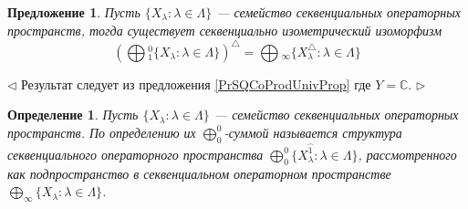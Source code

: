 \documentclass[12pt]{article}
\newtheorem{proposition}[theorem]{Предложение}
\newtheorem{definition}[theorem]{Определение}
\newenvironment{proof}{\par $\triangleleft$}{$\triangleright$}
\begin{document}
\begin{proposition}\label{PrDualOfCoprodIsProd}
Пусть $\{X_\lambda:\lambda\in \Lambda\}$ --- семейство секвенциальных операторных пространств, тогда существует секвенциально изометрический изоморфизм
$$
\left(\bigoplus{}_1^0\{X_\lambda:\lambda\in \Lambda\}\right)^\triangle
=\bigoplus{}_\infty\{X_\lambda^\triangle:\lambda\in \Lambda\}
$$
\end{proposition}
\begin{proof}
Результат следует из предложения \ref{PrSQCoProdUnivProp} где $Y=\mathbb{C}$.
\end{proof}

\begin{definition}\label{DefSQc0Sum}
Пусть $\{X_\lambda: \lambda \in \Lambda\}$ --- семейство секвенциальных операторных пространств. По определению их $\bigoplus_0^0$-суммой называется структура секвенциального операторного пространства $\bigoplus_0^0\{X_\lambda^{\wideparen{1}}:\lambda\in \Lambda\}$, рассмотренного как подпространство в секвенциальном операторном пространстве $\bigoplus_\infty\{X_\lambda:\lambda\in \Lambda\}$.
\end{definition}
\end{document}
